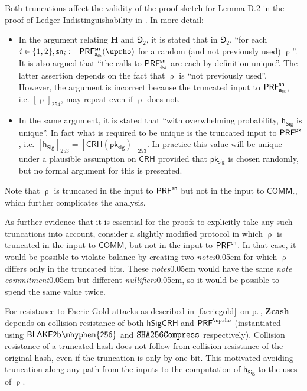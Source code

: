 \documentclass{article}
\renewcommand{\emph}[1]{\hspace{0.15em}{\fontfamily{pnc}\selectfont\scalebox{1.02}[0.999]{\textit{#1}}}\hspace{0.02em}}
\let\oldmathtt\mathtt
\renewcommand{\mathtt}[1]{\scalebox{1.02}[1.07]{$\oldmathtt{#1}$}}
\newcommand{\crossref}[1]{\autoref{#1}\, \emph{`\nameref*{#1}\kern -0.05em'} on p.\,\pageref*{#1}}
\newcommand{\term}[1]{\textsl{#1}\kern 0.05em\xspace}
\newcommand{\termbf}[1]{\textbf{#1}\xspace}
\newcommand{\Zcash}{\termbf{Zcash}}
\newcommand{\notes}{\term{notes}}
\newcommand{\noteCommitment}{\term{note commitment}}
\newcommand{\nullifiers}{\term{nullifiers}}
\newcommand{\hSigCRH}{\mathsf{hSigCRH}}
\newcommand{\CRH}{\mathsf{CRH}}
\newcommand{\SHA}{\mathtt{SHA256Compress}}
\newcommand{\Blake}[1]{\mathsf{BLAKE2b\kern 0.05em\mhyphen{#1}}}
\newcommand{\setof}[1]{\{{#1}\}}
\newcommand{\AuthPrivate}{\mathsf{a_{sk}}}
\newcommand{\PRF}[2]{\mathsf{{PRF}^{#2}_\mathnormal{#1}}}
\newcommand{\PRFsn}[1]{\PRF{#1}{sn}}
\newcommand{\PRFpk}[1]{\PRF{#1}{pk}}
\newcommand{\PRFrho}[1]{\PRF{#1}{\NoteAddressRand}}
\newcommand{\Commit}[1]{\mathsf{COMM}_{#1}}
\newcommand{\NoteCommitRand}{\mathsf{r}}
\newcommand{\NoteAddressRand}{\mathsf{\uprho}}
\newcommand{\pksig}{\mathsf{pk_{sig}}}
\newcommand{\hSig}{\mathsf{h_{Sig}}}
\begin{document}
Both truncations affect the validity of the proof sketch for Lemma D.2 in
the proof of Ledger Indistinguishability in \cite[Appendix D]{BCG+2014}.
In more detail:
\begin{itemize}
  \item In the argument relating $\mathbf{H}$ and $\Game_2$, it is stated that in $\Game_2$,
        ``for each $i \in \setof{1, 2}, \mathsf{sn}_i := \PRFsn{\AuthPrivate}(\NoteAddressRand)$
        for a random (and not previously used) $\NoteAddressRand$''. It is also
        argued that ``the calls to $\PRFsn{\AuthPrivate}$ are each by definition unique''.
        The latter assertion depends on the fact that $\NoteAddressRand$
        is ``not previously used''. However, the argument is incorrect
        because the truncated input to $\PRFsn{\AuthPrivate}$, i.e.
        $[\NoteAddressRand]_{254}$, may repeat even if $\NoteAddressRand$ does not.
  \item In the same argument, it is stated that ``with overwhelming probability,
        $\hSig$ is unique''. In fact what is required to be unique is the
        truncated input to $\PRFpk{}$, i.e. $[\hSig]_{253} = [\CRH(\pksig)]_{253}$.
        In practice this value will be unique under a plausible assumption on
        $\CRH$ provided that $\pksig$ is chosen randomly, but no formal argument
        for this is presented.
\end{itemize}

Note that $\NoteAddressRand$ is truncated in the input to $\PRFsn{}$
but not in the input to $\Commit{\NoteCommitRand}$, which further
complicates the analysis.

As further evidence that it is essential for the proofs to explicitly take any
such truncations into account, consider a slightly modified protocol in which
$\NoteAddressRand$ is truncated in the input to $\Commit{\NoteCommitRand}$
but not in the input to $\PRFsn{}$. In that case, it would be possible to
violate balance by creating two \notes for which $\NoteAddressRand$ differs
only in the truncated bits. These \notes would have the same \noteCommitment
but different \nullifiers, so it would be possible to spend the same value
twice.

For resistance to Faerie Gold attacks as described in
\crossref{faeriegold}, \Zcash depends on collision resistance of both
$\hSigCRH$ and $\PRFrho{}$ (instantiated using $\Blake{256}$ and $\SHA$
respectively). Collision resistance of a truncated hash
does not follow from collision resistance of the original hash, even if the
truncation is only by one bit. This motivated avoiding truncation along any
path from the inputs to the computation of $\hSig$ to the uses of
$\NoteAddressRand$.
\end{document}
